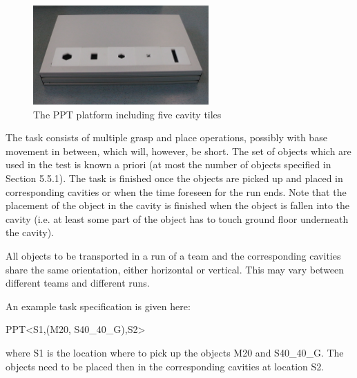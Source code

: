\begin{figure}
\centering
\includegraphics[width=0.6\textwidth ]{../images/ppt_plattform.jpg}
\caption{The PPT platform including five cavity tiles}
\label{fig:ppt_plattform}
\end{figure}

The task consists of multiple grasp and place operations, possibly with base movement in between, which will, however, be short. The set of objects which are used in the test is known a priori (at most the number of objects specified in Section 5.5.1). The task is finished once the objects are picked up and placed in corresponding cavities or when the time foreseen for the run ends. Note that the placement of the object in the cavity is finished when the object is fallen into the cavity (i.e. at least some part of the object has to touch ground floor underneath the cavity).
\par
All objects to be transported in a run of a team and the corresponding cavities share the same orientation, either horizontal or vertical. This may vary between different teams and different runs.
\par
An example task specification is given here:
\par
PPT\textless S1,(M20, S40\_40\_G),S2\textgreater
\par
where S1 is the location where to pick up the objects M20 and S40\_40\_G. The objects need to be placed then in the corresponding cavities at location S2.
%
%
%


